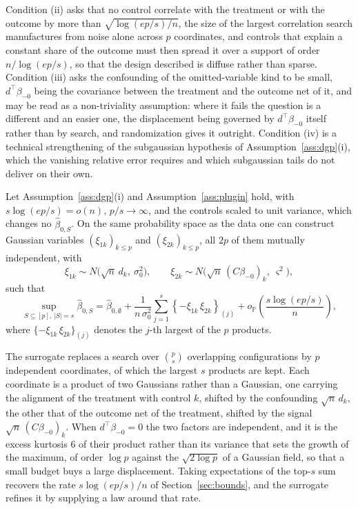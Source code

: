 Condition (ii) asks that no control correlate with the treatment or with
the outcome by more than $\sqrt{\log(ep/s)/n}$, the size of the largest
correlation search manufactures from noise alone across $p$ coordinates,
and controls that explain a constant share of the outcome must then
spread it over a support of order $n/\log(ep/s)$, so that the design
described is diffuse rather than sparse. Condition (iii) asks the
confounding of the omitted-variable kind to be small,
$d^\top \beta_{-0}$ being the covariance between the treatment and the
outcome net of it, and may be read as a non-triviality assumption: where
it fails the question is a different and an easier one, the displacement
being governed by $d^\top \beta_{-0}$ itself rather than by search, and
randomization gives it outright. Condition (iv) is a technical
strengthening of the subgaussian hypothesis of
Assumption~\ref{ass:dgp}(i), which the vanishing relative error requires
and which subgaussian tails do not deliver on their own.

\begin{theorem}\label{thm:plugin-separable}
Let Assumption~\ref{ass:dgp}(i) and Assumption~\ref{ass:plugin} hold,
with $s \log(ep/s) = o(n)$, $p/s \to \infty$, and the controls scaled to
unit variance, which changes no $\hat\beta_{0,S}$. On
the same probability space as the data one can construct Gaussian
variables $(\xi_{1k})_{k \le p}$ and $(\xi_{2k})_{k \le p}$, all $2p$ of
them mutually independent, with
\begin{equation*}
        \xi_{1k} \sim N\big(\sqrt n\, d_k,\ \sigma_0^2\big),
        \qquad
        \xi_{2k} \sim N\big(\sqrt n\, (C\beta_{-0})_k,\ \varsigma^2 \big),
\end{equation*}
such that
\begin{equation}\label{eq:plugin-theorem}
        \sup_{S \subseteq [p],\, |S| = s} \hat\beta_{0,S}
        =
        \hat\beta_{0,\emptyset}
        + \frac{1}{n\, \sigma_0^2}
        \sum_{j=1}^{s} \left\{ -\xi_{1k}\, \xi_{2k} \right\}_{(j)}
        + o_{\mathbb P}\!\left( \frac{s \log(ep/s)}{n} \right),
\end{equation}
where $\{-\xi_{1k}\, \xi_{2k}\}_{(j)}$ denotes the $j$-th largest of the
$p$ products.
\end{theorem}

The surrogate replaces a search over $\binom{p}{s}$ overlapping
configurations by $p$ independent coordinates, of which the largest $s$
products are kept. Each coordinate is a product of two Gaussians rather
than a Gaussian, one carrying the alignment of the treatment with control
$k$, shifted by the confounding $\sqrt n\, d_k$, the other that of the
outcome net of the treatment, shifted by the signal
$\sqrt n\, (C\beta_{-0})_k$. When $d^\top \beta_{-0} = 0$ the two factors
are independent, and it is the excess kurtosis $6$ of their product
rather than its variance that sets the growth of the maximum, of order
$\log p$ against the $\sqrt{2 \log p}$ of a Gaussian field, so that a
small budget buys a large displacement. Taking expectations of the
top-$s$ sum recovers the rate $s\log(ep/s)/n$ of
Section~\ref{sec:bounds}, and the surrogate refines it by supplying a law
around that rate.

